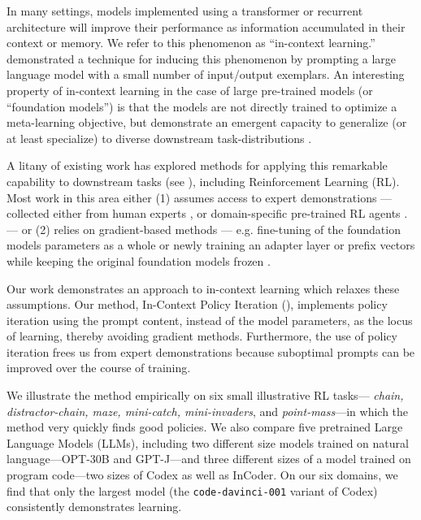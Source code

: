 \documentclass{article}
\begin{document}
In many settings, models implemented using a transformer or recurrent
architecture will improve their performance as information accumulated in their
context or memory. We refer to this phenomenon as ``in-context learning.''
\parencite{brown2020language} demonstrated a technique for inducing this phenomenon
by prompting a large language model with a small number of input/output
exemplars. An interesting property of in-context learning in the case of large
pre-trained models (or ``foundation models'') is that the models are not
directly trained to optimize a meta-learning objective, but demonstrate an
emergent capacity to generalize (or at least specialize) to diverse downstream
task-distributions \parencite{wei_emergent_2022}.

A litany of existing work has explored methods for applying this remarkable
capability to downstream tasks (see ), including
Reinforcement Learning (RL). Most work in this area either (1) assumes access to
expert demonstrations --- collected either from human experts
\parencite{huang_language_2022,baker_video_2022}, or domain-specific pre-trained RL
agents
\parencite{chen_decision_2021,lee_multi-game_2022,janner_offline_2021,reed_generalist_2022,xu_prompting_2022}.
--- or (2) relies on gradient-based methods --- e.g. fine-tuning of the
foundation models parameters as a whole
\parencite{lee_multi-game_2022,reed_generalist_2022,baker_video_2022} or newly
training an adapter layer or prefix vectors while keeping the original
foundation models frozen
\parencite{li_prefix-tuning_2021,singh_know_2022,karimi_mahabadi_prompt-free_2022}.

Our work demonstrates an approach to in-context learning which relaxes these
assumptions. Our method, In-Context Policy Iteration (\Algorithm{}), implements
policy iteration using the prompt content, instead of the model parameters, as
the locus of learning, thereby avoiding gradient methods. Furthermore, the use
of policy iteration frees us from expert demonstrations because suboptimal
prompts can be improved over the course of training.

We illustrate the method empirically on six small illustrative RL tasks---
\emph{chain, distractor-chain, maze, mini-catch, mini-invaders}, and
\emph{point-mass}---in which the method very quickly finds good policies.  We
also compare five pretrained Large Language Models (LLMs), including two
different size models trained on natural language---OPT-30B and GPT-J---and
three different sizes of a model trained on program code---two sizes of Codex as
well as InCoder. On our six domains, we find that only the largest model (the
\texttt{code-davinci-001} variant of Codex) consistently demonstrates learning.
\end{document}
